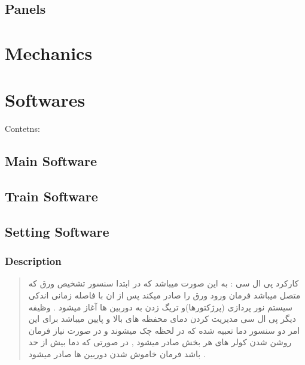 \documentclass[letterpaper,10pt,english]{sphinxmanual}
\begin{document}
\section{Panels}
\label{\detokenize{Panels:panels}}\label{\detokenize{Panels::doc}}
\sphinxstepscope


\chapter{Mechanics}
\label{\detokenize{Mechanics:mechanics}}\label{\detokenize{Mechanics::doc}}
\sphinxstepscope


\chapter{Softwares}
\label{\detokenize{Software:softwares}}\label{\detokenize{Software::doc}}
\sphinxAtStartPar
Contetns:

\sphinxstepscope


\section{Main Software}
\label{\detokenize{Main Software:main-software}}\label{\detokenize{Main Software::doc}}
\sphinxstepscope


\section{Train Software}
\label{\detokenize{Train Software:train-software}}\label{\detokenize{Train Software::doc}}
\sphinxstepscope


\section{Setting Software}
\label{\detokenize{Setting Software:setting-software}}\label{\detokenize{Setting Software::doc}}

\subsection{Description}
\label{\detokenize{Setting Software:description}}\begin{quote}\begin{farsi}

\sphinxAtStartPar
کارکرد پی ال سی : به این صورت میباشد که در ابتدا سنسور تشخیص ورق که متصل میباشد فرمان ورود ورق را صادر میکند پس از ان با فاصله زمانی اندکی سیستم نور پردازی (پرژکتورها)و تریگ زدن به دوربین ها آغاز میشود . وظیفه دیگر پی ال سی مدیریت کردن دمای محفظه های بالا و پایین میباشد برای این امر دو سنسور دما تعبیه شده که در لحظه چک میشوند و در صورت نیاز فرمان روشن شدن کولر های هر بخش صادر میشود , در صورتی که دما بیش از حد باشد فرمان خاموش شدن دوربین ها صادر میشود .
\end{farsi}\end{quote}
\end{document}
